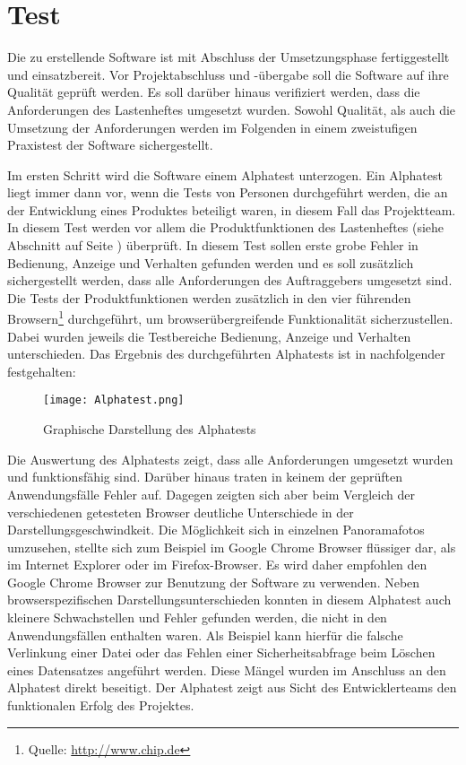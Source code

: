 \section{Test}
\label{sec:Test}

Die zu erstellende Software ist mit Abschluss der Umsetzungsphase fertiggestellt und einsatzbereit. Vor Projektabschluss und -übergabe soll die Software auf ihre Qualität geprüft werden. Es soll darüber hinaus verifiziert werden, dass die Anforderungen des Lastenheftes umgesetzt wurden. Sowohl Qualität, als auch die Umsetzung der Anforderungen werden im Folgenden in einem zweistufigen Praxistest der Software sichergestellt.

Im ersten Schritt wird die Software einem Alphatest unterzogen. Ein Alphatest liegt immer dann vor, wenn die Tests von Personen durchgeführt werden, die an der Entwicklung eines Produktes beteiligt waren, in diesem Fall das Projektteam. In diesem Test werden vor allem die Produktfunktionen des Lastenheftes (siehe Abschnitt  auf Seite \pageref{sec:Lastenheft}) überprüft. In diesem Test sollen erste grobe Fehler in Bedienung, Anzeige und Verhalten gefunden werden und es soll zusätzlich sichergestellt werden, dass alle Anforderungen des Auftraggebers umgesetzt sind. Die Tests der Produktfunktionen werden zusätzlich in den vier führenden Browsern\footnote{Quelle: \url{http://www.chip.de}} durchgeführt, um browserübergreifende Funktionalität sicherzustellen.
Dabei wurden jeweils die Testbereiche Bedienung, Anzeige und Verhalten unterschieden. Das Ergebnis des durchgeführten Alphatests ist in nachfolgender  festgehalten:

\begin{figure}[htb]
\centering
\texttt{[image: Alphatest.png]}
\caption[Mockup Backend]{Graphische Darstellung des Alphatests\protect\footnotemark}
\label{fig:Alphatest}
\end{figure}

Die Auswertung des Alphatests zeigt, dass alle Anforderungen umgesetzt wurden und funktionsfähig sind. Darüber hinaus
traten in keinem der geprüften Anwendungsfälle Fehler auf.
Dagegen zeigten sich aber beim Vergleich der verschiedenen getesteten Browser deutliche Unterschiede in der
Darstellungsgeschwindkeit.
Die Möglichkeit sich in einzelnen Panoramafotos umzusehen, stellte sich zum Beispiel im Google Chrome Browser
flüssiger dar, als im Internet Explorer oder im Firefox-Browser. Es wird daher empfohlen den Google Chrome Browser
zur Benutzung der Software zu verwenden.
Neben browserspezifischen Darstellungsunterschieden konnten in diesem Alphatest auch kleinere Schwachstellen und Fehler gefunden werden, die nicht in den Anwendungsfällen enthalten waren. Als Beispiel kann hierfür die 
falsche Verlinkung einer Datei oder das Fehlen einer Sicherheitsabfrage beim Löschen eines Datensatzes angeführt
werden.
Diese Mängel wurden im Anschluss an den Alphatest direkt beseitigt.
Der Alphatest zeigt aus Sicht des Entwicklerteams den funktionalen Erfolg des Projektes.

